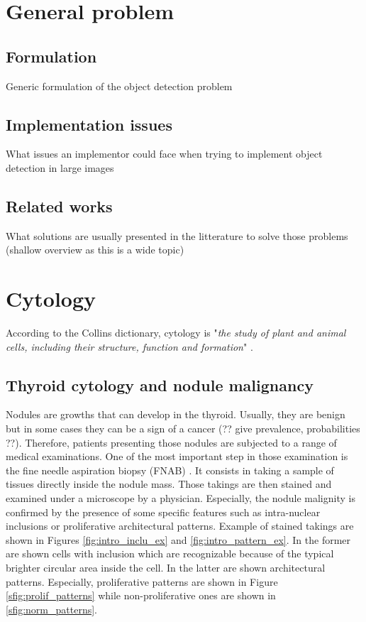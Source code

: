 \label{chap:context}
\section{General problem}
\subsection{Formulation}
Generic formulation of the object detection problem
\subsection{Implementation issues}
What issues an implementor could face when trying to implement object detection in large images
\subsection{Related works}
What solutions are usually presented in the litterature to solve those problems (shallow overview as this is a wide topic) 
\section{Cytology}
According to the Collins dictionary, cytology is "\textit{the study of plant and animal cells, including their structure, function and formation}" \cite{collins-cytology}. 

\subsection{Thyroid cytology and nodule malignancy}
\label{ssec:intro_thyroid_case}
Nodules are growths that can develop in the thyroid. Usually, they are benign but in some cases they can be a sign of a cancer (?? give prevalence, probabilities ??). Therefore, patients presenting those nodules are subjected to a range of medical examinations. One of the most important step in those examination is the fine needle aspiration biopsy (FNAB) \cite{bomeli2010evaluation}. It consists in taking a sample of tissues directly inside the nodule mass. Those takings are then stained and examined under a microscope by a physician. Especially, the nodule malignity is confirmed by the presence of some specific features such as intra-nuclear inclusions or proliferative architectural patterns. Example of stained takings are shown in Figures \ref{fig:intro_inclu_ex} and \ref{fig:intro_pattern_ex}. In the former are shown cells with inclusion which are recognizable because of the typical brighter circular area inside the cell. In the latter are shown architectural patterns. Especially, proliferative patterns are shown in Figure \ref{sfig:prolif_patterns} while non-proliferative ones are shown in \ref{sfig:norm_patterns}. 

